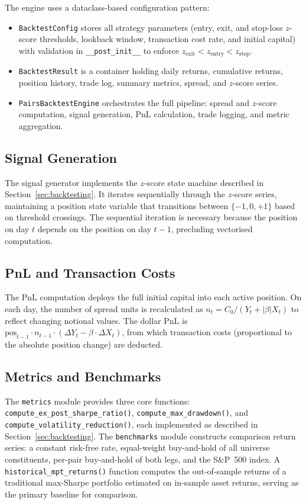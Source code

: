 \documentclass[a4paper]{report}
\begin{document}
The engine uses a dataclass-based configuration pattern:
\begin{itemize}
    \item \texttt{BacktestConfig} stores all strategy parameters (entry, exit, and stop-loss $z$-score thresholds, lookback window, transaction cost rate, and initial capital) with validation in \texttt{\_\_post\_init\_\_} to enforce $z_{\text{exit}} < z_{\text{entry}} < z_{\text{stop}}$.
    \item \texttt{BacktestResult} is a container holding daily returns, cumulative returns, position history, trade log, summary metrics, spread, and $z$-score series.
    \item \texttt{PairsBacktestEngine} orchestrates the full pipeline: spread and $z$-score computation, signal generation, PnL calculation, trade logging, and metric aggregation.
\end{itemize}

\subsection{Signal Generation}

The signal generator implements the $z$-score state machine described in Section~\ref{sec:backtesting}. It iterates sequentially through the $z$-score series, maintaining a position state variable that transitions between $\{-1, 0, +1\}$ based on threshold crossings. The sequential iteration is necessary because the position on day $t$ depends on the position on day $t-1$, precluding vectorised computation.

\subsection{PnL and Transaction Costs}

The PnL computation deploys the full initial capital into each active position. On each day, the number of spread units is recalculated as $n_t = C_0 / (Y_t + |\beta| X_t)$ to reflect changing notional values. The dollar PnL is $\text{pos}_{t-1} \cdot n_{t-1} \cdot (\Delta Y_t - \beta \cdot \Delta X_t)$, from which transaction costs (proportional to the absolute position change) are deducted.

\subsection{Metrics and Benchmarks}

The \texttt{metrics} module provides three core functions: \texttt{compute\_ex\_post\_sharpe\_ratio()}, \texttt{compute\_max\_drawdown()}, and \texttt{compute\_volatility\_reduction()}, each implemented as described in Section~\ref{sec:backtesting}. The \texttt{benchmarks} module constructs comparison return series: a constant risk-free rate, equal-weight buy-and-hold of all universe constituents, per-pair buy-and-hold of both legs, and the S\&P~500 index. A \texttt{historical\_mpt\_returns()} function computes the out-of-sample returns of a traditional max-Sharpe portfolio estimated on in-sample asset returns, serving as the primary baseline for comparison.
\end{document}
